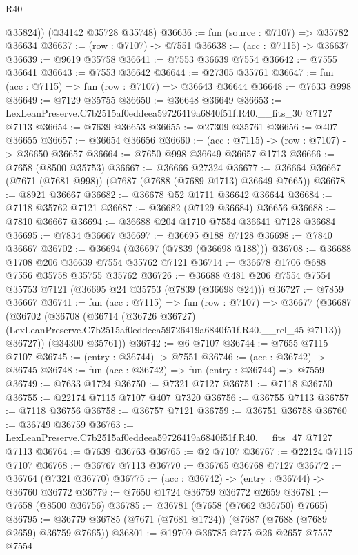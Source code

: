 \begin{lexlean}{R40}
\begin{coremodule}
        @35824))
    (@34142 @35728 @35748)
@36636 := fun (source : @7107) => @35782 @36634
@36637 := (row : @7107) -> @7551
@36638 := (acc : @7115) -> @36637
@36639 := @9619 @35758
@36641 := @7553 @36639 @7554
@36642 := @7555 @36641
@36643 := @7553 @36642
@36644 := @27305 @35761
@36647 := fun (acc : @7115) => fun (row : @7107) => @36643 @36644
@36648 := @7633 @998
@36649 := @7129 @35755
@36650 := @36648 @36649
@36653 := LexLeanPreserve.C7b2515af0eddeea59726419a6840f51f.R40.__fits_30 @7127 @7113
@36654 := @7639 @36653
@36655 := @27309 @35761
@36656 := @407 @36655
@36657 := @36654 @36656
@36660 := (acc : @7115) -> (row : @7107) -> @36650 @36657
@36664 := @7650 @998 @36649 @36657 @1713
@36666 := @7658 (@8500 @35753)
@36667 := @36666 @27324
@36677 := @36664 @36667 (@7671 (@7681 @998)) (@7687 (@7688 (@7689 @1713) @36649 @7665))
@36678 := @8921 @36667
@36682 := @36678 @52 @1711 @36642 @36644
@36684 := @7118 @35762 @7121
@36687 := @36682 (@7129 @36684) @36656
@36688 := @7810 @36667
@36694 := @36688 @204 @1710 @7554 @36641 @7128 @36684
@36695 := @7834 @36667
@36697 := @36695 @188 @7128
@36698 := @7840 @36667
@36702 := @36694 (@36697 (@7839 (@36698 @188)))
@36708 := @36688 @1708 @206 @36639 @7554 @35762 @7121
@36714 := @36678 @1706 @688 @7556 @35758 @35755 @35762
@36726 := @36688 @481 @206 @7554 @7554 @35753 @7121 (@36695 @24 @35753 (@7839 (@36698 @24)))
@36727 := @7859 @36667
@36741 := fun (acc : @7115) =>
  fun (row : @7107) =>
  @36677
    (@36687
      (@36702
        (@36708
          (@36714
            (@36726 @36727)
            (LexLeanPreserve.C7b2515af0eddeea59726419a6840f51f.R40.__rel_45 @7113))
          @36727))
      (@34300 @35761))
@36742 := @6 @7107
@36744 := @7655 @7115 @7107
@36745 := (entry : @36744) -> @7551
@36746 := (acc : @36742) -> @36745
@36748 := fun (acc : @36742) => fun (entry : @36744) => @7559
@36749 := @7633 @1724
@36750 := @7321 @7127
@36751 := @7118 @36750
@36755 := @22174 @7115 @7107 @407 @7320
@36756 := @36755 @7113
@36757 := @7118 @36756
@36758 := @36757 @7121
@36759 := @36751 @36758
@36760 := @36749 @36759
@36763 := LexLeanPreserve.C7b2515af0eddeea59726419a6840f51f.R40.__fits_47 @7127 @7113
@36764 := @7639 @36763
@36765 := @2 @7107
@36767 := @22124 @7115 @7107
@36768 := @36767 @7113
@36770 := @36765 @36768 @7127
@36772 := @36764 (@7321 @36770)
@36775 := (acc : @36742) -> (entry : @36744) -> @36760 @36772
@36779 := @7650 @1724 @36759 @36772 @2659
@36781 := @7658 (@8500 @36756)
@36785 := @36781 (@7658 (@7662 @36750) @7665)
@36795 := @36779 @36785 (@7671 (@7681 @1724)) (@7687 (@7688 (@7689 @2659) @36759 @7665))
@36801 := @19709 @36785 @775 @26 @2657 @7557 @7554

\end{coremodule}
\end{lexlean}
